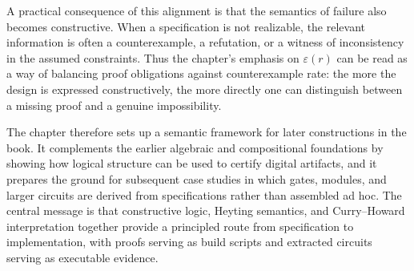 A practical consequence of this alignment is that the semantics of failure also becomes constructive. When a specification is not realizable, the relevant information is often a counterexample, a refutation, or a witness of inconsistency in the assumed constraints. Thus the chapter's emphasis on \(\varepsilon(r)\) can be read as a way of balancing proof obligations against counterexample rate: the more the design is expressed constructively, the more directly one can distinguish between a missing proof and a genuine impossibility.

The chapter therefore sets up a semantic framework for later constructions in the book. It complements the earlier algebraic and compositional foundations by showing how logical structure can be used to certify digital artifacts, and it prepares the ground for subsequent case studies in which gates, modules, and larger circuits are derived from specifications rather than assembled ad hoc. The central message is that constructive logic, Heyting semantics, and Curry--Howard interpretation together provide a principled route from specification to implementation, with proofs serving as build scripts and extracted circuits serving as executable evidence.
